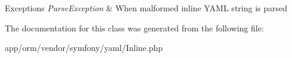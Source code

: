 \begin{DoxyExceptions}{Exceptions}
{\em Parse\+Exception} & When malformed inline Y\+A\+ML string is parsed \\
\hline
\end{DoxyExceptions}


The documentation for this class was generated from the following file\+:\begin{DoxyCompactItemize}
\item 
app/orm/vendor/symfony/yaml/Inline.\+php\end{DoxyCompactItemize}
